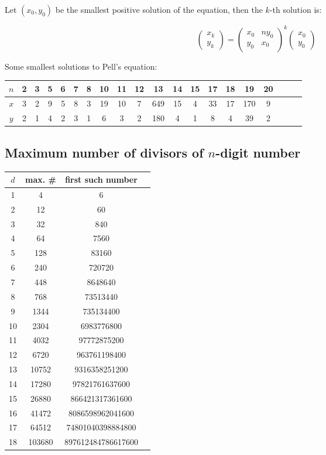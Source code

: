 Let $(x_0, y_0)$ be the smallest positive solution of the equation, then the $k$-th solution is:

\begin{equation*}
\begin{pmatrix}x_k \\ y_k\end{pmatrix} =
\begin{pmatrix}
  x_0 & ny_0 \\
  y_0 & x_0
\end{pmatrix} ^k
\begin{pmatrix}x_0 \\ y_0\end{pmatrix}
\end{equation*}

Some smallest solutions to Pell's equation:

  \begin{tabular}{|c|c|c|c|c|c|c|c|c|c|c|c|c|c|c|c|c|c|c|c|}
  \hline
  $n$ & 2 & 3 & 5 & 6 & 7 & 8 & 10 & 11 & 12 & 13  & 14 & 15 & 17 & 18 & 19 & 20 \\ \hline
  $x$ & 3 & 2 & 9 & 5 & 8 & 3 & 19 & 10 & 7  & 649 & 15 & 4 & 33 & 17 & 170 & 9 \\ \hline
  $y$ & 2 & 1 & 4 & 2 & 3 & 1 & 6  & 3  & 2  & 180 & 4  & 1 & 8 & 4 & 39 & 2 \\ \hline
  \end{tabular}


\subsection{Maximum number of divisors of $n$-digit number}
  
  \begin{tabular}{|c|c|c|c|}
  \hline
  $d$ & max. \# & first such number \\ \hline
1 & 4 & 6 \\
2 & 12 & 60 \\
3 & 32 & 840 \\
4 & 64 & 7560 \\ 
5 & 128 & 83160  \\
6 & 240 & 720720 \\
7 & 448 & 8648640  \\
8 & 768 & 73513440  \\
9 & 1344 & 735134400 \\
10 & 2304 & 6983776800 \\
11 & 4032 & 97772875200 \\
12 & 6720 & 963761198400 \\
13 & 10752 & 9316358251200 \\
14 & 17280 & 97821761637600 \\
15 & 26880 & 866421317361600 \\
16 & 41472 & 8086598962041600 \\
17 & 64512 & 74801040398884800 \\
18 & 103680 & 897612484786617600 \\
  \hline
  \end{tabular}

